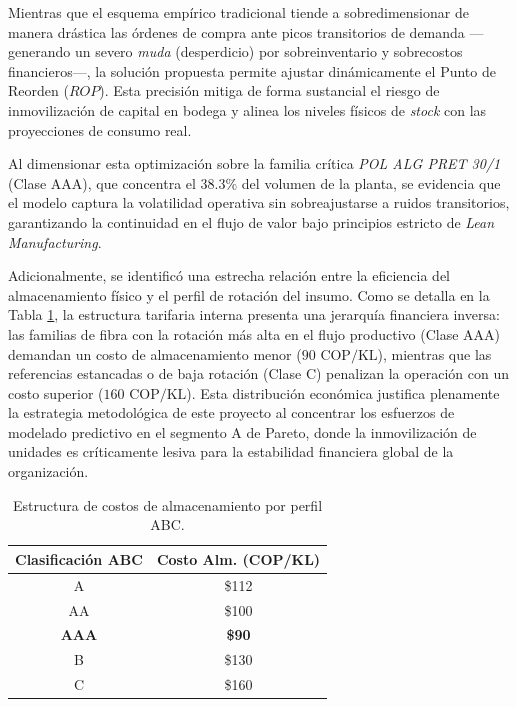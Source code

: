 \documentclass[conference,twoside]{IEEEtran}
\begin{document}
Mientras que el esquema empírico tradicional tiende a sobredimensionar de manera drástica las órdenes de compra ante picos transitorios de demanda —generando un severo \textit{muda} (desperdicio) por sobreinventario y sobrecostos financieros—, la solución propuesta permite ajustar dinámicamente el Punto de Reorden ($ROP$). Esta precisión mitiga de forma sustancial el riesgo de inmovilización de capital en bodega y alinea los niveles físicos de \textit{stock} con las proyecciones de consumo real.

Al dimensionar esta optimización sobre la familia crítica \textit{POL ALG PRET 30/1} (Clase AAA), que concentra el $38.3\%$ del volumen de la planta, se evidencia que el modelo captura la volatilidad operativa sin sobreajustarse a ruidos transitorios, garantizando la continuidad en el flujo de valor bajo principios estricto de \textit{Lean Manufacturing}. 

Adicionalmente, se identificó una estrecha relación entre la eficiencia del almacenamiento físico y el perfil de rotación del insumo. Como se detalla en la Tabla \ref{tab:costos_abc}, la estructura tarifaria interna presenta una jerarquía financiera inversa: las familias de fibra con la rotación más alta en el flujo productivo (Clase AAA) demandan un costo de almacenamiento menor ($90\text{ COP/KL}$), mientras que las referencias estancadas o de baja rotación (Clase C) penalizan la operación con un costo superior ($160\text{ COP/KL}$). Esta distribución económica justifica plenamente la estrategia metodológica de este proyecto al concentrar los esfuerzos de modelado predictivo en el segmento A de Pareto, donde la inmovilización de unidades es críticamente lesiva para la estabilidad financiera global de la organización.

\begin{table}[H]
\centering
\caption{Estructura de costos de almacenamiento por perfil ABC.}
\label{tab:costos_abc}
\footnotesize
\setlength{\tabcolsep}{12pt}
\begin{tabular}{|c|c|}
\hline
\textbf{Clasificación ABC} & \textbf{Costo Alm. (COP/KL)} \\ \hline
A & \$112 \\ \hline
AA & \$100 \\ \hline
\textbf{AAA} & \textbf{\$90} \\ \hline
B & \$130 \\ \hline
C & \$160 \\ \hline
\end{tabular}
\end{table}
\end{document}
